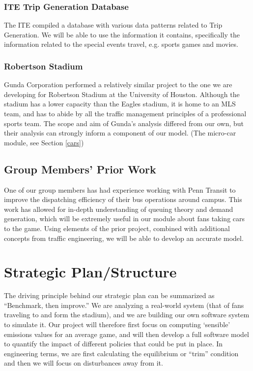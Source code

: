 \documentclass[12pt]{article}
\begin{document}
\subsubsection{ITE Trip Generation Database}
The ITE compiled a database with various data patterns related to Trip
Generation. \cite{ite08} We will be able to use the information it contains,
specifically the information related to the special events travel,
e.g. sports games and movies.

\subsubsection{Robertson Stadium}
Gunda Corporation performed a relatively similar project to the one we
are developing for Robertson Stadium at the University of
Houston.\cite{gunda} Although the stadium has a lower capacity than
the Eagles stadium, \cite{robertson-stadium} it is home to an MLS
team, and has to abide by all the traffic management principles of a
professional sports team. The scope and aim of Gunda's analysis
differed from our own, but their analysis can strongly inform a
component of our model. (The micro-car module, see Section \ref{cars})

\subsection{Group Members' Prior Work}
One of our group members has had experience working with Penn Transit
to improve the dispatching efficiency of their bus operations around
campus. This work has allowed for in-depth understanding of queuing
theory and demand generation, which will be extremely useful in our
module about fans taking cars to the game. Using elements of the prior
project, combined with additional concepts from traffic engineering,
we will be able to develop an accurate model.


\section{Strategic Plan/Structure}
The driving principle behind our strategic plan can be summarized as
``Benchmark, then improve.'' We are analyzing a real-world system
(that of fans traveling to and form the stadium), and we are building
our own software system to simulate it. Our project will therefore
first focus on computing `sensible' emissions values for an average
game, and will then develop a full software model to quantify the
impact of different policies that could be put in place. In
engineering terms, we are first calculating the equilibrium or
``trim'' condition and then we will focus on disturbances away from
it.
\end{document}
